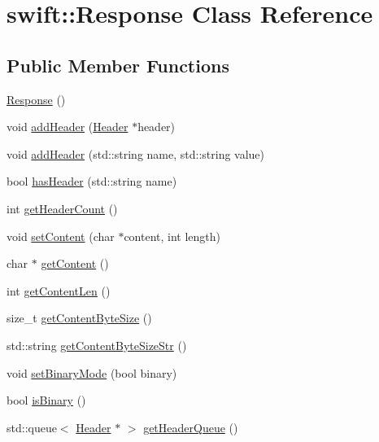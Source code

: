 \hypertarget{classswift_1_1_response}{\section{swift\-:\-:Response Class Reference}
\label{classswift_1_1_response}
}
\subsection*{Public Member Functions}
\begin{DoxyCompactItemize}
\item 
\hyperlink{classswift_1_1_response_a10f959b77214b0ea7a0ec154a76086a5}{Response} ()
\item 
void \hyperlink{classswift_1_1_response_a6e21abef101a79628db07071f98604a2}{add\-Header} (\hyperlink{classswift_1_1_header}{Header} $\ast$header)
\item 
void \hyperlink{classswift_1_1_response_ab6d61f4bc7ee54aa4b3455c2d9fa36c3}{add\-Header} (std\-::string name, std\-::string value)
\item 
bool \hyperlink{classswift_1_1_response_a1251c89c062e157c481faa6dd2034f66}{has\-Header} (std\-::string name)
\item 
int \hyperlink{classswift_1_1_response_a84de03abc1c55a7cd8f0bf0b3e22479e}{get\-Header\-Count} ()
\item 
void \hyperlink{classswift_1_1_response_a60462803819683419263b32412186c0b}{set\-Content} (char $\ast$content, int length)
\item 
char $\ast$ \hyperlink{classswift_1_1_response_a350021b3a6afb34a1fbfefd17f541b5e}{get\-Content} ()
\item 
int \hyperlink{classswift_1_1_response_a1e7ec1b7a0cb3b665b122b68f431ef92}{get\-Content\-Len} ()
\item 
size\-\_\-t \hyperlink{classswift_1_1_response_a63c00d2d22061d7c225ff72fa0df74d3}{get\-Content\-Byte\-Size} ()
\item 
std\-::string \hyperlink{classswift_1_1_response_a5e2b37743efe9f036b3edc5b004de18c}{get\-Content\-Byte\-Size\-Str} ()
\item 
void \hyperlink{classswift_1_1_response_a3fc7dd485e4868914ebb4458880adf89}{set\-Binary\-Mode} (bool binary)
\item 
bool \hyperlink{classswift_1_1_response_a7a63f4bd7c1c9e042b89f5185c231dd2}{is\-Binary} ()
\item 
std\-::queue$<$ \hyperlink{classswift_1_1_header}{Header} $\ast$ $>$ \hyperlink{classswift_1_1_response_ad93bf7c6d9de7c62cd8ece268e603036}{get\-Header\-Queue} ()
\end{DoxyCompactItemize}


